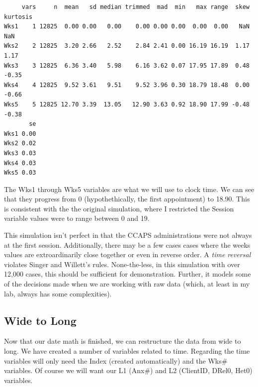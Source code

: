 \documentclass[
  11pt,
]{book}
\begin{document}
\begin{verbatim}
     vars     n  mean   sd median trimmed  mad  min   max range  skew kurtosis
Wks1    1 12825  0.00 0.00   0.00    0.00 0.00 0.00  0.00  0.00   NaN      NaN
Wks2    2 12825  3.20 2.66   2.52    2.84 2.41 0.00 16.19 16.19  1.17     1.17
Wks3    3 12825  6.36 3.40   5.98    6.16 3.62 0.07 17.95 17.89  0.48    -0.35
Wks4    4 12825  9.52 3.61   9.51    9.52 3.96 0.30 18.79 18.48  0.00    -0.66
Wks5    5 12825 12.70 3.39  13.05   12.90 3.63 0.92 18.90 17.99 -0.48    -0.38
       se
Wks1 0.00
Wks2 0.02
Wks3 0.03
Wks4 0.03
Wks5 0.03
\end{verbatim}

The Wks1 through Wks5 variables are what we will use to clock time. We can see that they progress from 0 (hypothethically, the first appointment) to 18.90. This is consistent with the the original simulation, where I restricted the Session variable values were to range between 0 and 19.

This simulation isn't perfect in that the CCAPS administrations were not always at the first session. Additionally, there may be a few cases cases where the weeks values are extroardinarily close together or even in reverse order. A \emph{time reversal} violates Singer and Willett's \citeyearpar{singer_applied_2003} rules. None-the-less, in this simulation with over 12,000 cases, this should be sufficient for demonstration. Further, it models some of the decisions made when we are working with raw data (which, at least in my lab, always has some complexities).

\hypertarget{wide-to-long}{%
\subsection{Wide to Long}\label{wide-to-long}}

Now that our date math is finished, we can restructure the data from wide to long. We have created a number of variables related to time. Regarding the time variables will only need the Index (created automatically) and the Wks\# variables. Of course we will want our L1 (Anx\#) and L2 (ClientID, DRel0, Het0) variables.
\end{document}
